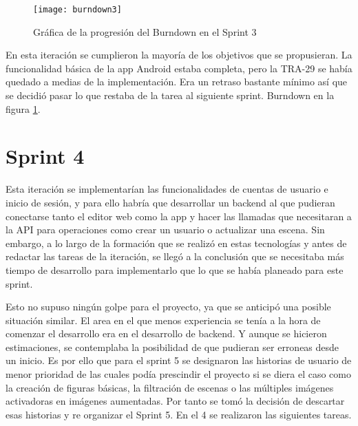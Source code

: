 \begin{table}[H]
\label{TRA-30}
\end{table}

\begin{figure}[h]
    \centering
    \texttt{[image: burndown3]}
    \caption[Burndown Sprint 3]{Gráfica de la progresión del Burndown en el Sprint 3}
	\label{fig:burndown3}
\end{figure}

En esta iteración se cumplieron la mayoría de los objetivos que se propusieran. La funcionalidad básica de la app Android estaba completa, pero la TRA-29 se había quedado a medias de la implementación. Era un retraso bastante mínimo así que se decidió pasar lo que restaba de la tarea al siguiente sprint. Burndown en la figura \ref{fig:burndown3}.

\section{Sprint 4}

Esta iteración se implementarían las funcionalidades de cuentas de usuario e inicio de sesión, y para ello habría que desarrollar un backend al que pudieran conectarse tanto el editor web como la app y hacer las llamadas que necesitaran a la API para operaciones como crear un usuario o actualizar una escena. Sin embargo, a lo largo de la formación que se realizó en estas tecnologías y antes de redactar las tareas de la iteración, se llegó a la conclusión que se necesitaba más tiempo de desarrollo para implementarlo que lo que se había planeado para este sprint.

Esto no supuso ningún golpe para el proyecto, ya que se anticipó una posible situación similar. El area en el que menos experiencia se tenía a la hora de comenzar el desarrollo era en el desarrollo de backend. Y aunque se hicieron estimaciones, se contemplaba la posibilidad de que pudieran ser erroneas desde un inicio. Es por ello que para el sprint 5 se designaron las historias de usuario de menor prioridad de las cuales podía prescindir el proyecto si se diera el caso como la creación de figuras básicas, la filtración de escenas o las múltiples imágenes activadoras en imágenes aumentadas. Por tanto se tomó la decisión de descartar esas historias y re organizar el Sprint 5. En el 4 se realizaron las siguientes tareas.

